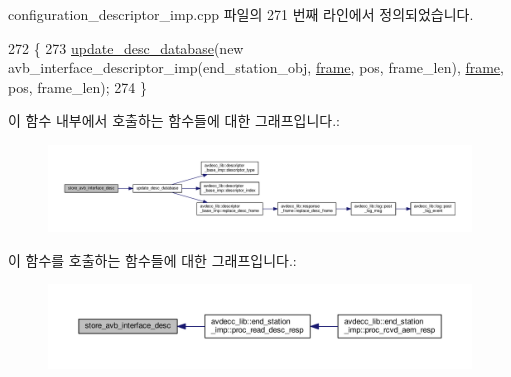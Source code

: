 configuration\+\_\+descriptor\+\_\+imp.\+cpp 파일의 271 번째 라인에서 정의되었습니다.


\begin{DoxyCode}
272 \{
273     \hyperlink{classavdecc__lib_1_1configuration__descriptor__imp_a98445251711b644b6da09d2354003778}{update\_desc\_database}(\textcolor{keyword}{new} avb\_interface\_descriptor\_imp(end\_station\_obj, 
      \hyperlink{gst__avb__playbin_8c_ac8e710e0b5e994c0545d75d69868c6f0}{frame}, pos, frame\_len), \hyperlink{gst__avb__playbin_8c_ac8e710e0b5e994c0545d75d69868c6f0}{frame}, pos, frame\_len);
274 \}
\end{DoxyCode}


이 함수 내부에서 호출하는 함수들에 대한 그래프입니다.\+:
\nopagebreak
\begin{figure}[H]
\begin{center}
\leavevmode
\includegraphics[width=350pt]{classavdecc__lib_1_1configuration__descriptor__imp_adce6aa8188c090f25008576e36a389c7_cgraph}
\end{center}
\end{figure}




이 함수를 호출하는 함수들에 대한 그래프입니다.\+:
\nopagebreak
\begin{figure}[H]
\begin{center}
\leavevmode
\includegraphics[width=350pt]{classavdecc__lib_1_1configuration__descriptor__imp_adce6aa8188c090f25008576e36a389c7_icgraph}
\end{center}
\end{figure}


